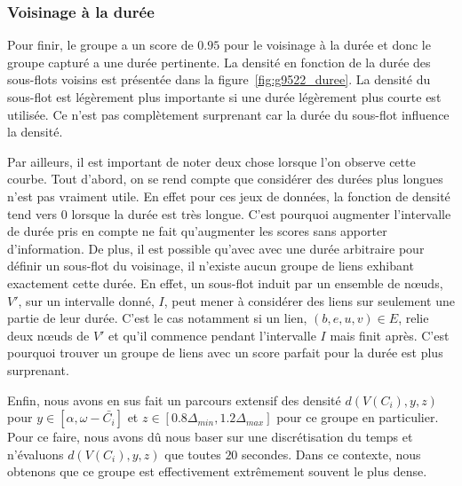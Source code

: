 \subsubsection*{Voisinage à la durée}
Pour finir, le groupe a un score de $0.95$ pour le voisinage à la durée et donc le groupe capturé a une durée pertinente.
La densité en fonction de la durée des sous-flots voisins est présentée dans la figure~\ref{fig:g9522_duree}.
La densité du sous-flot est légèrement plus importante si une durée légèrement plus courte est utilisée.
Ce n'est pas complètement surprenant car la durée du sous-flot influence la densité.

Par ailleurs, il est important de noter deux chose lorsque l'on observe cette courbe.
Tout d'abord, on se rend compte que considérer des durées plus longues n'est pas vraiment utile.
En effet pour ces jeux de données, la fonction de densité tend vers $0$ lorsque la durée est très longue.
C'est pourquoi augmenter l'intervalle de durée pris en compte ne fait qu'augmenter les scores sans apporter d'information.
De plus, il est possible qu'avec avec une durée arbitraire pour définir un sous-flot du voisinage, il n'existe aucun groupe de liens exhibant exactement cette durée.
En effet, un sous-flot induit par un ensemble de n\oe{}uds, $V'$, sur un intervalle donné, $I$, peut mener à considérer des liens sur seulement une partie de leur durée.
C'est le cas notamment si un lien, $(b,e,u,v) \in E$, relie deux n\oe{}uds de $V'$ et qu'il commence pendant l'intervalle $I$ mais finit après.
C'est pourquoi trouver un groupe de liens avec un score parfait pour la durée est plus surprenant.

\bigskip

Enfin, nous avons en sus fait un parcours extensif des densité $d(V(C_i),y,z)$ pour $y \in [\alpha, \omega - \bar{C_i}]$ et $z \in [0.8\Delta_{min}, 1.2\Delta_{max}]$ pour ce groupe en particulier.
Pour ce faire, nous avons dû nous baser sur une discrétisation du temps et n'évaluons $d(V(C_i),y,z)$ que toutes $20$ secondes.
Dans ce contexte, nous obtenons que ce groupe est effectivement extrêmement souvent le plus dense.

